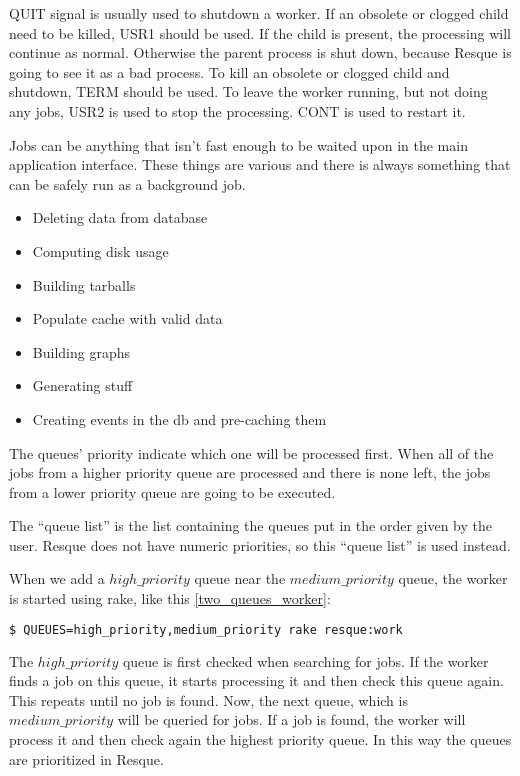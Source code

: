 QUIT signal is usually used to shutdown a worker.
If an obsolete or clogged child need to be killed, USR1 should be used. If the child is present, the processing will continue as normal. Otherwise the parent process is shut down, because Resque is going to see it as a bad process.
To kill an obsolete or clogged child and shutdown, TERM should be used.
To leave the worker running, but not doing any jobs, USR2 is used to stop the processing. CONT is used to restart it.


Jobs can be anything that isn't fast enough to be waited upon in the main application interface. These things are various and there is always something that can be safely run as a background job.
\begin{itemize}
  \item Deleting data from database
  \item Computing disk usage
  \item Building tarballs
  \item Populate cache with valid data
  \item Building graphs
  \item Generating stuff
  \item Creating events in the db and pre-caching them
\end{itemize}

The queues' priority indicate which one will be processed first. When all of the jobs from a higher priority queue are processed and there is none left, the jobs from a lower priority queue are going to be executed.

The ``queue list'' is the list containing the queues put in the order given by the user. Resque does not have numeric priorities, so this ``queue list'' is used instead. 

When we add a $high\_priority$ queue near the $medium\_priority$ queue, the worker is started using rake, like this \ref{two_queues_worker}:
\begin{lstlisting}[language=Bash, caption={Working on two queues}, label=two_queues_worker]
$ QUEUES=high_priority,medium_priority rake resque:work
\end{lstlisting}

The $high\_priority$ queue is first checked when searching for jobs. If the worker finds a job on this queue, it starts processing it and then check this queue again. This repeats until no job is found. Now, the next queue, which is $medium\_priority$ will be queried for jobs. If a job is found, the worker will process it and then check again the highest priority queue. In this way the queues are prioritized in Resque.


\clearpage

